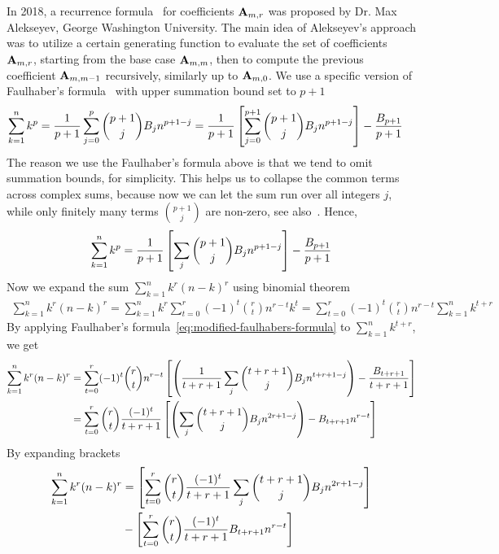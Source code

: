 In 2018, a recurrence formula~\cite{alekseyev2018mathoverflow} for coefficients ${\mathbf{A}} \sb{m,r}$
was proposed by Dr. Max Alekseyev, George Washington University.
The main idea of Alekseyev's approach was to utilize a certain generating function to evaluate
the set of coefficients ${\mathbf{A}} \sb{m,r}$,
starting from the base case ${\mathbf{A}} \sb{m,m}$, then to compute the previous coefficient ${\mathbf{A}} \sb{m,m-1}$
recursively, similarly up to ${\mathbf{A}} \sb{m,0}$.
We use a specific version of Faulhaber's formula~\cite{beardon1996sums} with upper summation bound set to $p+1$
\begin{align*}
    \sum_{k=1}^{n} k^{p}
    = \frac{1}{p+1}\sum_{j=0}^{p} \binom{p+1}{j} {B}\sb{j} n^{p+1-j}
    &= \frac{1}{p+1} \left[ \sum_{j=0}^{p+1} \binom{p+1}{j} {B}\sb{j} n^{p+1-j} \right] - \frac{{B}\sb{p+1}}{p+1}
\end{align*}
The reason we use the Faulhaber's formula above is that we tend to omit summation bounds, for simplicity.
This helps us to collapse the common terms across complex sums, because now we can let the sum run over all integers $j$,
while only finitely many terms $\binom{p+1}{j}$ are non-zero, see also~\cite{knuth1992two}.
Hence,
\begin{align}
    \label{eq:modified-faulhabers-formula}
    \sum_{k=1}^{n} k^{p}
    = \frac{1}{p+1} \left[ \sum_{j} \binom{p+1}{j} {B}\sb{j} n^{p+1-j} \right] - \frac{{B}\sb{p+1}}{p+1}
\end{align}
Now we expand the sum $\sum_{k=1}^{n} k^{r} (n-k)^{r}$ using binomial theorem
\begin{align*}
    \sum_{k=1}^{n} k^{r} (n-k)^{r}
    = \sum_{k=1}^{n} k^{r} \sum_{t=0}^{r} (-1)^t \binom{r}{t} n^{r-t} k^{t}
    = \sum_{t=0}^{r} (-1)^t \binom{r}{t} n^{r-t} \sum_{k=1}^{n} k^{t+r}
\end{align*}
By applying Faulhaber's formula~\eqref{eq:modified-faulhabers-formula} to $\sum_{k=1}^{n} k^{t+r}$, we get
\begin{align*}
    \sum_{k=1}^{n} k^{r} (n-k)^{r}
    &= \sum_{t=0}^{r} (-1)^t \binom{r}{t} n^{r-t} \left[ \left( \frac{1}{t+r+1} \sum_{j} \binom{t+r+1}{j} {B}\sb{j} n^{t+r+1-j} \right) - \frac{{B}\sb{t+r+1}}{t+r+1} \right] \\
    &= \sum_{t=0}^{r} \binom{r}{t} \frac{(-1)^t}{t+r+1} \left[ \left( \sum_{j} \binom{t+r+1}{j} {B}\sb{j} n^{2r+1-j}  \right) - {B}\sb{t+r+1} n^{r-t} \right]
\end{align*}
By expanding brackets
\begin{align*}
    \sum_{k=1}^{n} k^{r} (n-k)^{r}
    &= \left[ \sum_{t=0}^{r} \binom{r}{t} \frac{(-1)^t}{t+r+1} \sum_{j} \binom{t+r+1}{j} {B}\sb{j} n^{2r+1-j}  \right] \\
    &- \left[ \sum_{t=0}^{r} \binom{r}{t} \frac{(-1)^t}{t+r+1} {B}\sb{t+r+1} n^{r-t} \right]
\end{align*}
